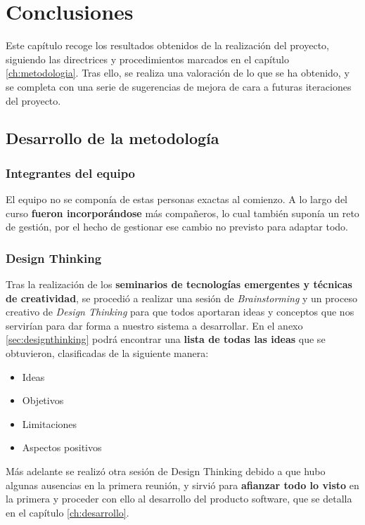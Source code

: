 \chapter{Conclusiones}
\label{ch:conclusiones}
Este capítulo recoge los resultados obtenidos de la realización del proyecto, siguiendo las directrices y procedimientos marcados en el capítulo \ref{ch:metodologia}. Tras ello, se realiza una valoración de lo que se ha obtenido, y se completa con una serie de sugerencias de mejora de cara a futuras iteraciones del proyecto.

\section{Desarrollo de la metodología}
\subsection{Integrantes del equipo}
El equipo no se componía de estas personas exactas al comienzo. A lo largo del curso \textbf{fueron incorporándose} más compañeros, lo cual también suponía un reto de gestión, por el hecho de gestionar ese cambio no previsto para adaptar todo.\\

\subsection{Design Thinking}
Tras la realización de los \textbf{seminarios de tecnologías emergentes y técnicas de creatividad}, se procedió a realizar una sesión de \textit{Brainstorming} y un proceso creativo de \textit{Design Thinking} para que todos aportaran ideas y conceptos que nos servirían para dar forma a nuestro sistema a desarrollar. En el anexo \ref{sec:designthinking} podrá encontrar una \textbf{lista de todas las ideas} que se obtuvieron, clasificadas de la siguiente manera:

\begin{itemize}
    \item Ideas
    \item Objetivos
    \item Limitaciones
    \item Aspectos positivos
\end{itemize}

Más adelante se realizó otra sesión de Design Thinking debido a que hubo algunas ausencias en la primera reunión, y sirvió para \textbf{afianzar todo lo visto} en la primera y proceder con ello al desarrollo del producto software, que se detalla en el capítulo \ref{ch:desarrollo}.\\

